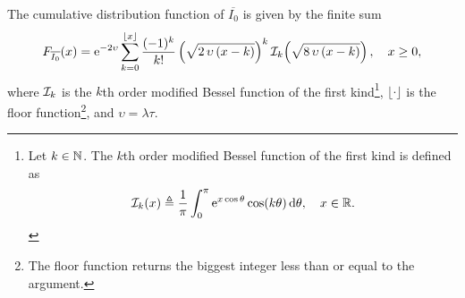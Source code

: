 \begin{theorem} \label{th:F_I0}
    The cumulative distribution function of $\overline{I_0}$ is given by the finite sum
    \begin{equation*}
    	F_{\overline{I_0}}(x) = \euler^{-2\upsilon} \sum_{k=0}^{\lfloor x \rfloor} \dfrac{(-1)^k}{k!} \left(\sqrt{2\,\upsilon\,(x-k)}\right)^k \cal{I}_k\!\left(\sqrt{8\,\upsilon\,(x-k)}\right),\quad x \geq 0,
    \end{equation*}
    where $\cal{I}_k$ is the $k$th order modified Bessel function of the first kind\footnote{Let $k\in\N$. The $k$th order modified Bessel function of the first kind is defined as \vspace{-2mm}\[\cal{I}_k(x) \triangleq \frac{1}{\pi}\int_0^\pi \euler^{x\cos\theta}\cos(k\theta)\,\d\theta,\quad x\in\R.\vspace{-3mm}\]}, $\lfloor \cdot \rfloor$ is the floor function\footnote{The floor function returns the biggest integer less than or equal to the argument.}, and $\upsilon = \lambda\tau$.
\end{theorem}
